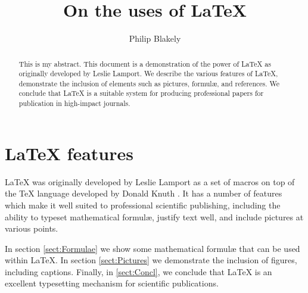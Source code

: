 \documentclass[final,3p,times,twocolumn]{elsarticle}
\begin{document}
\begin{frontmatter}



\title{On the uses of \LaTeX}


\author{Philip Blakely}

\address{Cavendish Laboratory, Department of Physics, J J Thomson
  Avenue, Cambridge. CB3 0HE}

\begin{abstract}
This is my abstract. This document is a demonstration of the power of
\LaTeX{} as originally developed by Leslie Lamport. We describe the
various features of \LaTeX{}, demonstrate the inclusion of elements such
as pictures, formul\ae, and references.
We conclude that LaTeX is a suitable system for producing professional
papers for publication in high-impact journals.
\end{abstract}

\end{frontmatter}


\section{\LaTeX{} features}
\LaTeX{} was originally developed by Leslie Lamport \cite{LaTeXBook} as a set of
macros on top of the \TeX{} language developed by Donald Knuth \cite{TeXBook}. It has a
number of features which make it well suited to professional
scientific publishing, including the ability to typeset mathematical
formul\ae, justify text well, and include pictures at various
points.\par
In section \ref{sect:Formulae} we show some mathematical formul\ae
that can be used within \LaTeX{}. In section \ref{sect:Pictures} we
demonstrate the inclusion of figures, including captions. Finally, in
\ref{sect:Concl}, we conclude that \LaTeX{} is an excellent typesetting
mechanism for scientific publications.
\end{document}

